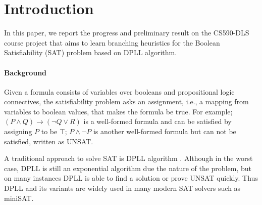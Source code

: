 \documentclass[sigplan,10pt]{acmart}\settopmatter{printfolios=true,printccs=false,printacmref=false}
\begin{document}


\maketitle

\renewcommand\thefootnotecopyrightpermission{}

\section{Introduction}

In this paper, we report the progress and preliminary result on the CS590-DLS course project that aims 
to learn branching heuristics for the Boolean Satisfiability (SAT) problem based on DPLL algorithm. 

\paragraph{Background}

Given a formula consists of variables over booleans and propositional logic connectives, the satisfiability
problem asks an assignment, i.e., a mapping from variables to boolean values, that makes the formula be true. 
For example; $(P \wedge Q) \to (\neg Q \vee R)$ is a well-formed formula and can be satisfied by assigning
$P$ to be $\top$; $P \wedge \neg P$ is another well-formed formula but can not be satisfied, written as UNSAT.

A traditional approach to solve SAT is DPLL algorithm \cite{Davis:1962:MPT:368273.368557}. 
Although in the worst case, DPLL is still an exponential algorithm due the nature of the problem,
but on many instances DPLL is able to find a solution or prove UNSAT quickly.
Thus DPLL and its variants are widely used in many modern SAT solvers such as miniSAT.
\end{document}
